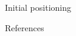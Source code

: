 \documentclass{beamer}
\begin{document}
\begin{frame}{Initial positioning}
\end{frame}

\nocite{*}

\begin{frame}{References}
  
  
\end{frame}
\end{document}
